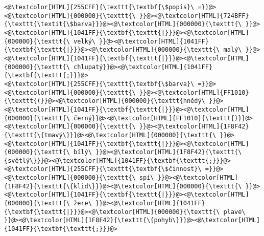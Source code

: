 \begin{lstlisting}
<@\textcolor[HTML]{255CFF}{\texttt{\textbf{\$popis}\ =}}@><@\textcolor[HTML]{000000}{\texttt{\ }}@><@\textcolor[HTML]{724BFF}{\texttt{\textit{\$barva}}}@><@\textcolor[HTML]{000000}{\texttt{\ }}@><@\textcolor[HTML]{1041FF}{\textbf{\texttt{|}}}@><@\textcolor[HTML]{000000}{\texttt{\ velký\ }}@><@\textcolor[HTML]{1041FF}{\textbf{\texttt{|}}}@><@\textcolor[HTML]{000000}{\texttt{\ malý\ }}@><@\textcolor[HTML]{1041FF}{\textbf{\texttt{|}}}@><@\textcolor[HTML]{000000}{\texttt{\ chlupatý}}@><@\textcolor[HTML]{1041FF}{\textbf{\texttt{;}}}@>
<@\textcolor[HTML]{255CFF}{\texttt{\textbf{\$barva}\ =}}@><@\textcolor[HTML]{000000}{\texttt{\ }}@><@\textcolor[HTML]{FF1010}{\texttt{(}}@><@\textcolor[HTML]{000000}{\texttt{hnědý\ }}@><@\textcolor[HTML]{1041FF}{\textbf{\texttt{|}}}@><@\textcolor[HTML]{000000}{\texttt{\ černý}}@><@\textcolor[HTML]{FF1010}{\texttt{)}}@><@\textcolor[HTML]{000000}{\texttt{\ }}@><@\textcolor[HTML]{1F8F42}{\texttt{\{tmavý\}}}@><@\textcolor[HTML]{000000}{\texttt{\ }}@><@\textcolor[HTML]{1041FF}{\textbf{\texttt{|}}}@><@\textcolor[HTML]{000000}{\texttt{\ bílý\ }}@><@\textcolor[HTML]{1F8F42}{\texttt{\{světlý\}}}@><@\textcolor[HTML]{1041FF}{\textbf{\texttt{;}}}@>
<@\textcolor[HTML]{255CFF}{\texttt{\textbf{\$činnost}\ =}}@><@\textcolor[HTML]{000000}{\texttt{\ spí\ }}@><@\textcolor[HTML]{1F8F42}{\texttt{\{klid\}}}@><@\textcolor[HTML]{000000}{\texttt{\ }}@><@\textcolor[HTML]{1041FF}{\textbf{\texttt{|}}}@><@\textcolor[HTML]{000000}{\texttt{\ žere\ }}@><@\textcolor[HTML]{1041FF}{\textbf{\texttt{|}}}@><@\textcolor[HTML]{000000}{\texttt{\ plave\ }}@><@\textcolor[HTML]{1F8F42}{\texttt{\{pohyb\}}}@><@\textcolor[HTML]{1041FF}{\textbf{\texttt{;}}}@>
\end{lstlisting}
